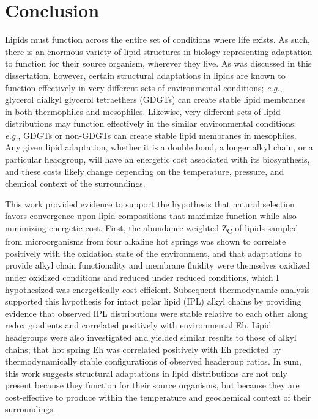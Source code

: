 \chapter[CONCLUSION]{Conclusion}

Lipids must function across the entire set of conditions where life exists. As such, there is an enormous variety of lipid structures in biology representing adaptation to function for their source organism, wherever they live. As was discussed in this dissertation, however, certain structural adaptations in lipids are known to function effectively in very different sets of environmental conditions; \textit{e.g.}, glycerol dialkyl glycerol tetraethers (GDGTs) can create stable lipid membranes in both thermophiles and mesophiles. Likewise, very different sets of lipid distributions may function effectively in the similar environmental conditions; \textit{e.g.}, GDGTs or non-GDGTs can create stable lipid membranes in mesophiles. Any given lipid adaptation, whether it is a double bond, a longer alkyl chain, or a particular headgroup, will have an energetic cost associated with its biosynthesis, and these costs likely change depending on the temperature, pressure, and chemical context of the surroundings.

This work provided evidence to support the hypothesis that natural selection favors convergence upon lipid compositions that maximize function while also minimizing energetic cost. First, the abundance-weighted Z\textsubscript{C} of lipids sampled from microorganisms from four alkaline hot springs was shown to correlate positively with the oxidation state of the environment, and that adaptations to provide alkyl chain functionality and membrane fluidity were themselves oxidized under oxidized conditions and reduced under reduced conditions, which I hypothesized was energetically cost-efficient. Subsequent thermodynamic analysis supported this hypothesis for intact polar lipid (IPL) alkyl chains by providing evidence that observed IPL distributions were stable relative to each other along redox gradients and correlated positively with environmental Eh. Lipid headgroups were also investigated and yielded similar results to those of alkyl chains; that hot spring Eh was correlated positively with Eh predicted by thermodynamically stable configurations of observed headgroup ratios. In sum, this work suggests structural adaptations in lipid distributions are not only present because they function for their source organisms, but because they are cost-effective to produce within the temperature and geochemical context of their surroundings.

